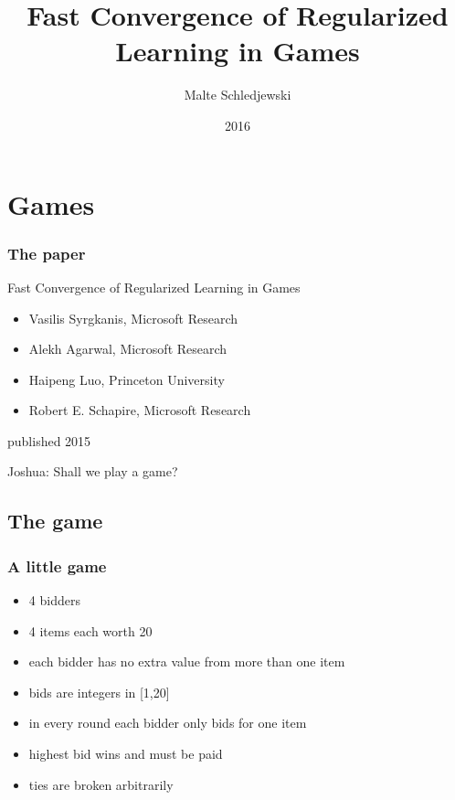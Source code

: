 \documentclass{beamer}
\title{Fast Convergence of Regularized Learning in Games}
\author{Malte Schledjewski}
\institute{Saarbrücken Graduate School of Computer Science}
\date{2016}
\begin{document}
	
\frame{\titlepage}

\section{Games}

\begin{frame}
	\frametitle{The paper}
	\begin{block}{Fast Convergence of Regularized Learning in Games}
		\begin{itemize}
			\item Vasilis Syrgkanis, Microsoft Research
			\item Alekh Agarwal, Microsoft Research
			\item Haipeng Luo, Princeton University
			\item Robert E. Schapire, Microsoft Research
		\end{itemize}
		published 2015
	\end{block}
\end{frame}


\begin{frame}[c]
	\begin{center}
		\Huge Joshua: Shall we play a game?
	\end{center}
\end{frame}

\subsection{The game}
\begin{frame}
	\frametitle{A little game}
	\begin{itemize}
		\item 4 bidders
		\item 4 items each worth 20
		\item each bidder has no extra value from more than one item
		\item bids are integers in [1,20]
		\item in every round each bidder only bids for one item 
		\item highest bid wins and must be paid
		\item ties are broken arbitrarily 
	\end{itemize}
\end{frame}
\end{document}
